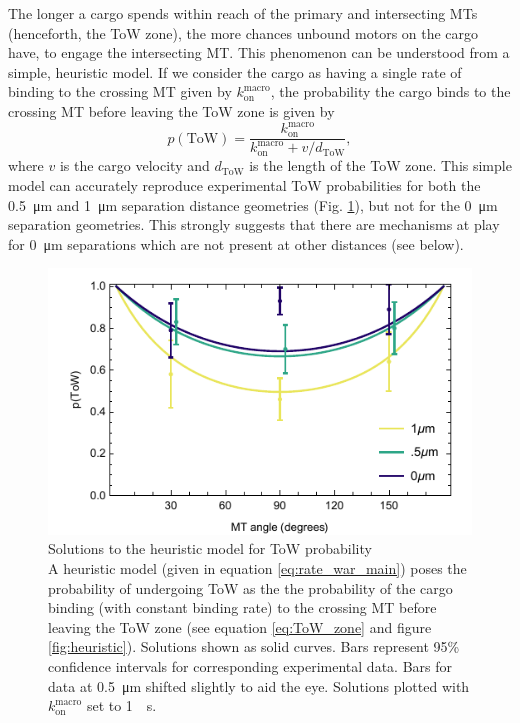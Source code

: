 The longer a cargo spends within reach of the primary and intersecting MTs (henceforth, the ToW zone), the more chances unbound motors on the cargo have, to engage the intersecting MT. This phenomenon can be understood from a simple, heuristic model. If we consider the cargo as having a single rate of binding to the crossing MT given by $k_{\text{on}}^\text{macro}$, the probability the cargo binds to the crossing MT before leaving the ToW zone is given by 
\begin{equation} \label{eq:rate_war_main}
p(\text{ToW})=\frac{k_{\text{on}}^\text{macro}}{k_{\text{on}}^\text{macro} +  v / d_\text{ToW} },
\end{equation}
where $v$ is the cargo velocity and $d_\text{ToW}$ is the length of the ToW zone. This simple model can accurately reproduce experimental ToW probabilities for both the \SI{.5}{\micro\meter} and \SI{1}{\micro\meter} separation distance geometries (Fig. \ref{fig:heuristicEXP}), but not for the \SI{0}{\micro\meter} separation geometries. This strongly suggests that there are mechanisms at play for \SI{0}{\micro\meter} separations which are not present at other distances (see below).

\begin{figure}
\centering
\includegraphics[width=12cm]{heuristicEXP.pdf}
\caption[Solutions to the heuristic model for ToW probability]{Solutions to the heuristic model for ToW probability \\
A heuristic model (given in equation \ref{eq:rate_war_main}) poses the probability of undergoing ToW as the the probability of the cargo binding (with constant binding rate) to the crossing MT before leaving the ToW zone (see equation \ref{eq:ToW_zone} and figure \ref{fig:heuristic}). 
Solutions shown as solid curves. Bars represent 95\% confidence intervals for corresponding experimental data. Bars for data at \SI{.5}{\micro\meter} shifted slightly to aid the eye. Solutions plotted with $k_\text{on}^\text{macro}$ set to \SI{1}{\per\second}.
} \label{fig:heuristicEXP}
\end{figure}

